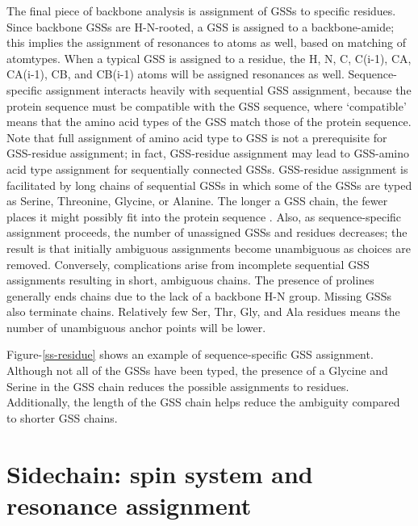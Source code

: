 The final piece of backbone analysis is assignment of GSSs to specific 
residues.  Since backbone GSSs are H-N-rooted, a GSS is assigned to a 
backbone-amide; this implies the assignment of resonances to atoms as well, 
based on matching of atomtypes.  When a typical GSS is assigned to a residue, 
the H, N, C, C(i-1), CA, CA(i-1), CB, and CB(i-1) atoms will be assigned 
resonances as well.  Sequence-specific assignment interacts heavily with 
sequential GSS assignment, because the protein sequence must be compatible 
with the GSS sequence, where `compatible' means that the amino acid types 
of the GSS match those of the protein sequence.  Note that full assignment 
of amino acid type to GSS is not a prerequisite for GSS-residue assignment; 
in fact, GSS-residue assignment may lead to GSS-amino acid type assignment 
for sequentially connected GSSs.  GSS-residue assignment is facilitated by 
long chains of sequential GSSs in which some of the GSSs are typed as Serine, 
Threonine, Glycine, or Alanine.  The longer a GSS chain, the fewer places it 
might possibly fit into the protein sequence \cite{saga}.  Also, 
as sequence-specific assignment proceeds, the number of unassigned GSSs and 
residues decreases; the result is that initially ambiguous assignments become 
unambiguous as choices are removed.  Conversely, complications arise from 
incomplete sequential GSS assignments resulting in short, ambiguous chains.  
The presence of prolines generally ends chains due to the lack of a backbone 
H-N group.  Missing GSSs also terminate chains.  Relatively few Ser, Thr, Gly, 
and Ala residues means the number of unambiguous anchor points will be lower.

Figure-\ref{ss-residue} shows an example of sequence-specific GSS assignment.
Although not all of the GSSs have been typed, the presence of a Glycine and
Serine in the GSS chain reduces the possible assignments to residues.
Additionally, the length of the GSS chain helps reduce the ambiguity compared
to shorter GSS chains.


\section{Sidechain: spin system and resonance assignment}


